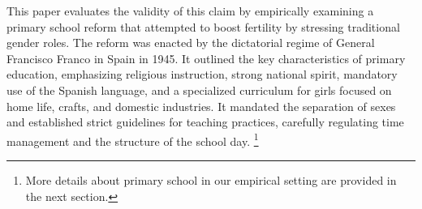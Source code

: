 \documentclass[a4paper,oneside,final,onecolumn,12pt,english]{article}
\begin{document}
This paper evaluates the validity of this claim by empirically examining a primary school reform that attempted to boost fertility by stressing traditional gender roles. The reform was enacted by the dictatorial regime of General Francisco Franco in Spain in 1945. %
It outlined the key characteristics of primary education, emphasizing religious instruction, strong national spirit, mandatory use of the Spanish language, and a specialized curriculum for girls focused on home life, crafts, and domestic industries. %
It mandated the separation of sexes %
and established strict guidelines for teaching practices, carefully regulating time management and the structure of the school day.%
\footnote{More details about primary school in our empirical setting are provided in the next section.} %
\end{document}
